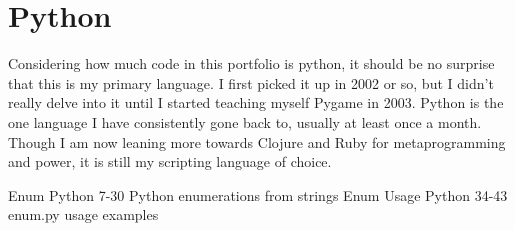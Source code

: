 \section{Python}

Considering how much code in this portfolio is python, it should be no
surprise that this is my primary language.  I first picked it up in 2002 or so,
but I didn't really delve into it until I started teaching myself Pygame in
2003.  Python is the one language I have consistently gone back to, usually at
least once a month.  Though I am now leaning more towards Clojure and Ruby for
metaprogramming and power, it is still my scripting language of choice.

 {Enum} {Python} {7-30} {Python enumerations from strings}
 {Enum Usage} {Python} {34-43} {enum.py usage examples}
